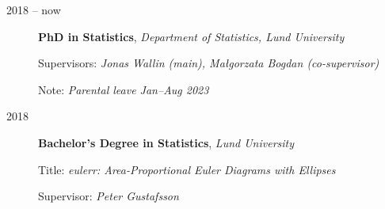 \documentclass[english,a4paper]{article}
\renewcommand*{%
  \mkbibnamegiven
}[1]{\ifitemannotation{highlight}{\textbf{#1}}{#1}}
\renewcommand*{%
  \mkbibnamefamily
}[1]{\ifitemannotation{highlight}{\textbf{#1}}{#1}}
\begin{document}
\begin{description}
  \item[2018 -- now] {
    \textbf{PhD in Statistics}, \emph{Department of Statistics, Lund
      University}

    Supervisors: \emph{Jonas Wallin (main), Małgorzata Bogdan (co-supervisor)}

    Note: \emph{Parental leave Jan--Aug 2023}

    }

  \item[2018] {
    \textbf{Bachelor's Degree in Statistics}, \emph{Lund University}

    Title: \emph{eulerr: Area-Proportional Euler Diagrams with Ellipses}

    Supervisor: \emph{Peter Gustafsson}
    }






\end{description}




\end{document}
